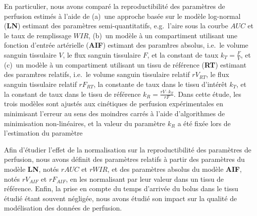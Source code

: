\begin{otherlanguage}{francais}
En particulier, nous avons compar\'e la reproductibilit\'e des param\`etres de perfusion estim\'es \`a l'aide de (a)~une approche bas\'ee sur le mod\`ele log-normal (\textbf{LN}) estimant des param\`etres semi-quantitatifs, e.g.~l'aire sous la courbe $AUC$ et le taux de remplissage $WIR$, (b)~un mod\`ele \`a un compartiment utilisant une fonction d'entr\'ee art\'erielle (\textbf{AIF}) estimant des param\`tres absolus, i.e.~le volume sanguin tissulaire $V$, le flux sanguin tissulaire $F$, et la constant de taux $k_T = \frac{F}{V}$, et (c)~un mod\`ele \`a un compartiment utilisant un tissu de r\'ef\'erence (\textbf{RT}) estimant des param\`tres relatifs, i.e.~le volume sanguin tissulaire relatif $rV_{RT}$, le flux sanguin tissulaire relatif $rF_{RT}$, la constante de taux dans le tissu d'int\'er\^et $k_{T}$, et la constant de taux dans le tissu de r\'ef\'erence $k_R = \frac{rV \cdot k_T}{rF}$.
Dans cette \'etude, les trois mod\`eles sont ajust\'es aux cin\'etiques de perfusion exp\'erimentales en minimisant l'erreur au sens des moindres carr\'es \`a l'aide d'algorithmes de minimisation non-lin\'eaires, et la valeur du param\`etre $k_R$ a \'et\'e fix\'ee lors de l'estimation du param\`etre

Afin d'\'etudier l'effet de la normalisation sur la reproductibilit\'e des param\`etres de perfusion, nous avons d\'efinit des param\`etres relatifs \`a partir des param\`etres du mod\`ele \textbf{LN}, not\'es $rAUC$ et $rWIR$, et des param\`etres absolus du mod\`ele \textbf{AIF}, not\'es $rV_{AIF}$ et $rF_{AIF}$, en les normalisant par leur valeur dans un tissu de r\'ef\'erence.
Enfin, la prise en compte du temps d'arriv\'ee du bolus dans le tissu \'etudi\'e \'etant souvent n\'eglig\'ee, nous avons \'etudi\'e son impact sur la qualit\'e de mod\'elisation des donn\'ees de perfusion.


\end{otherlanguage}
